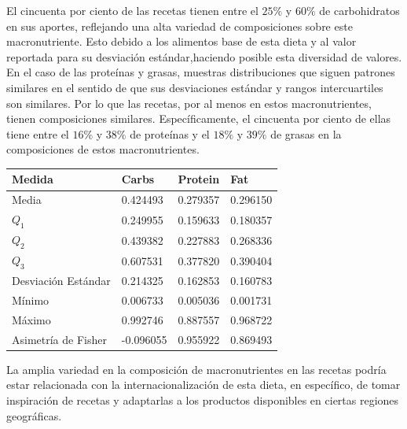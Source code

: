 \documentclass[12pt,a4paper]{article}
\begin{document}
            El cincuenta por ciento de las recetas tienen entre el $25\%$ y $60\%$ 
            de carbohidratos en sus aportes, reflejando una alta variedad de composiciones 
            sobre este macronutriente. Esto debido a los alimentos base de esta dieta y 
            al valor reportada para su desviación estándar,haciendo posible esta 
            diversidad de valores.\\

            En el caso de las proteínas y grasas, muestras distribuciones que siguen 
            patrones similares en el sentido de que sus desviaciones estándar y rangos 
            intercuartiles son similares. Por lo que las recetas, por al menos en estos 
            macronutrientes, tienen composiciones similares. Específicamente, el cincuenta 
            por ciento de ellas tiene entre el $16\%$ y $38\%$ de proteínas	y el $18\%$ y 
            $39\%$ de grasas en la composiciones de estos macronutrientes.

            \begin{center}
                \begin{tabular}{l|lll}
                    \toprule
                        Medida & Carbs & Protein & Fat \\
                    \midrule
                        Media               & 0.424493 & 0.279357 & 0.296150  \\
                        $Q_1$               & 0.249955 & 0.159633 & 0.180357  \\
                        $Q_2$               & 0.439382 & 0.227883 & 0.268336  \\
                        $Q_3$               & 0.607531 & 0.377820 & 0.390404  \\
                        Desviación Estándar & 0.214325 & 0.162853 & 0.160783  \\
                        Mínimo              & 0.006733 & 0.005036 & 0.001731  \\
                        Máximo              & 0.992746 & 0.887557 & 0.968722  \\
                        Asimetría de Fisher & -0.096055 & 0.955922 & 0.869493 \\
                    \bottomrule
                \end{tabular}
            \end{center}

            La amplia variedad en la composición de macronutrientes en las recetas podría 
            estar relacionada con la internacionalización de esta dieta, en específico, de 
            tomar inspiración de recetas y adaptarlas a los productos disponibles en 
            ciertas regiones geográficas.\\
\end{document}
